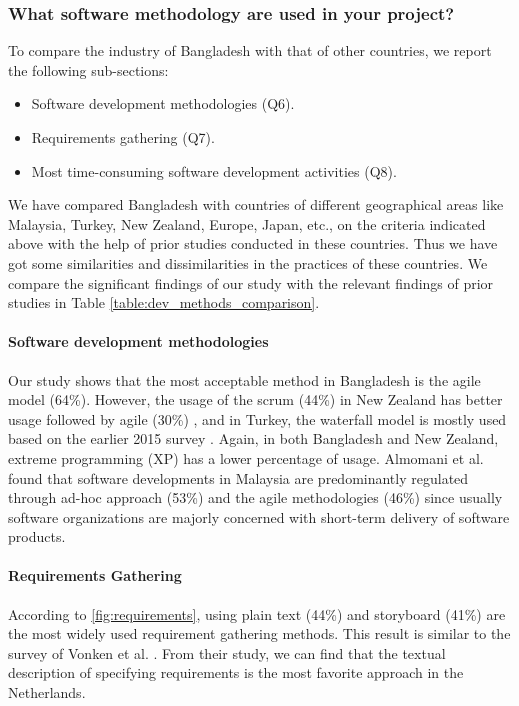 \subsubsection{What software methodology are used in your project?}

To compare the industry of Bangladesh with that of other countries, we report the following sub-sections:

\begin{itemize}
\item Software development methodologies (Q6).
\item Requirements gathering (Q7).
\item Most time-consuming software development activities (Q8).
\end{itemize}



We have compared Bangladesh with countries of different geographical areas like Malaysia, Turkey, New Zealand, Europe, Japan, etc., on the criteria indicated above with the help of prior studies conducted in these countries. Thus we have got some similarities and dissimilarities in the practices of these countries. We compare the significant findings of our study with the relevant findings of prior studies in Table \ref{table:dev_methods_comparison}.


\paragraph{Software development methodologies}
Our study shows that the most acceptable method in Bangladesh is the agile model (64\%). However, the usage of the scrum (44\%) in New Zealand has better usage followed by agile (30\%) \cite{Wang2018}, and in Turkey, the waterfall model is mostly used based on the earlier 2015 survey \cite{Garousi2015}.  Again, in both Bangladesh and New Zealand, extreme programming (XP) has a lower percentage of usage. Almomani et al. \cite{Almomani2015} found that software developments in Malaysia are predominantly regulated through ad-hoc approach (53\%) and the agile methodologies (46\%) since usually software organizations are majorly concerned with short-term delivery of software products.


\paragraph{Requirements Gathering}
According to \ref{fig:requirements}, using plain text (44\%) and storyboard (41\%) are the most widely used requirement gathering methods. This result is similar to the survey of Vonken et al. \cite{Vonken2012}. From their study, we can find that the textual description of specifying requirements is the most favorite approach in the Netherlands.


